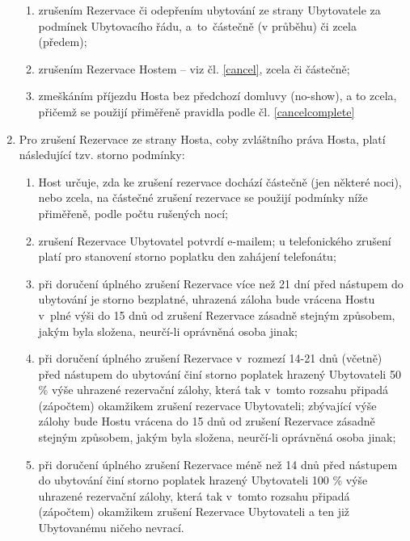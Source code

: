 \documentclass[a4paper]{scrartcl}
\begin{document}
\begin{enumerate}
        \begin{enumerate}

          \item
                zrušením Rezervace či odepřením ubytování ze strany Ubytovatele za
                podmínek Ubytovacího řádu, a~to~částečně (v průběhu) či zcela
                (předem);
          \item
                zrušením Rezervace Hostem -- viz čl. \ref{cancel}, zcela či částečně;
          \item
                zmeškáním příjezdu Hosta bez předchozí domluvy (no-show), a to
                zcela, přičemž se použijí přiměřeně pravidla podle čl. \ref{cancelcomplete}
        \end{enumerate}
  \item
        \label{cancel} Pro zrušení Rezervace ze strany Hosta, coby zvláštního práva Hosta,
        platí následující tzv. storno podmínky:

        \begin{enumerate}

          \item
                Host určuje, zda ke zrušení rezervace dochází částečně (jen
                některé noci), nebo zcela, na částečné zrušení rezervace se
                použijí podmínky níže přiměřeně, podle počtu rušených nocí;
          \item
                zrušení Rezervace Ubytovatel potvrdí e-mailem; u telefonického
                zrušení platí pro stanovení storno poplatku den zahájení
                telefonátu;
          \item
                při doručení úplného zrušení Rezervace více než 21 dní před
                nástupem do ubytování je storno bezplatné, uhrazená záloha bude
                vrácena Hostu v~plné výši do 15 dnů od zrušení Rezervace zásadně
                stejným způsobem, jakým byla složena, neurčí-li oprávněná osoba
                jinak;
          \item
                při doručení úplného zrušení Rezervace v~rozmezí 14-21 dnů
                (včetně) před nástupem do ubytování činí storno poplatek hrazený
                Ubytovateli 50 \% výše uhrazené rezervační zálohy, která tak
                v~tomto rozsahu připadá (zápočtem) okamžikem zrušení rezervace
                Ubytovateli; zbývající výše zálohy bude Hostu vrácena do 15 dnů od
                zrušení Rezervace zásadně stejným způsobem, jakým byla složena,
                neurčí-li oprávněná osoba jinak;
          \item
                \label{cancelcomplete} při doručení úplného zrušení Rezervace méně než 14 dnů před
                nástupem do ubytování činí storno poplatek hrazený Ubytovateli 100
                \% výše uhrazené rezervační zálohy, která tak v~tomto rozsahu
                připadá (zápočtem) okamžikem zrušení Rezervace Ubytovateli a ten
                již Ubytovanému ničeho nevrací.
        \end{enumerate}
\end{enumerate}
\end{document}
